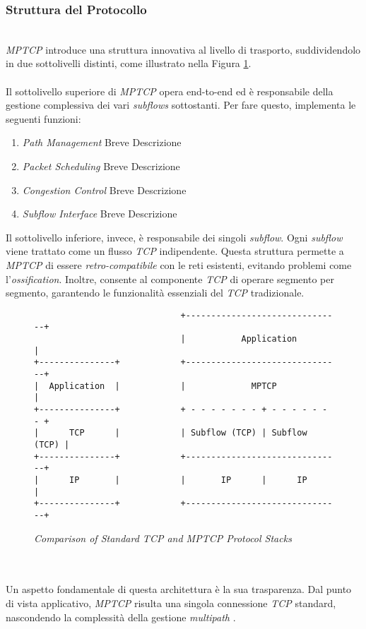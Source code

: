 \subsubsection{Struttura del Protocollo}
~\\
\indent \emph{MPTCP} introduce una struttura innovativa al livello di trasporto, suddividendolo in due sottolivelli distinti, come illustrato nella Figura \ref{comparison}.
\\\\
Il sottolivello superiore di \emph{MPTCP} opera end-to-end ed è responsabile della gestione complessiva dei vari \emph{subflows} sottostanti. Per fare questo, implementa le seguenti funzioni:
\begin{enumerate}[label=\roman*]
    \item \emph{Path Management} Breve Descrizione 
    \item \emph{Packet Scheduling} Breve Descrizione 
    \item \emph{Congestion Control} Breve Descrizione 
    \item \emph{Subflow Interface} Breve Descrizione 
\end{enumerate}
\noindent Il sottolivello inferiore, invece, è responsabile dei singoli \emph{subflow}. Ogni \emph{subflow} viene trattato come un flusso \emph{TCP} indipendente. Questa struttura permette a \emph{MPTCP} di essere \emph{retro-compatibile} con le reti esistenti, evitando problemi come l'\emph{ossification}. Inoltre, consente al componente \emph{TCP} di operare segmento per segmento, garantendo le funzionalità essenziali del \emph{TCP} tradizionale.
\begin{figure}[!h]
  \centering
    \begin{BVerbatim}
                             +-------------------------------+
                             |           Application         |
+---------------+            +-------------------------------+
|  Application  |            |             MPTCP             |
+---------------+            + - - - - - - - + - - - - - - - +
|      TCP      |            | Subflow (TCP) | Subflow (TCP) |
+---------------+            +-------------------------------+
|      IP       |            |       IP      |      IP       |
+---------------+            +-------------------------------+
               \end{BVerbatim}
    \caption{\emph{Comparison of Standard TCP and MPTCP Protocol Stacks}}
    \label{comparison}
    \end{figure}
\\\\
\noindent Un aspetto fondamentale di questa architettura è la sua trasparenza. Dal punto di vista applicativo, \emph{MPTCP} risulta una singola connessione \emph{TCP} standard, nascondendo la complessità della gestione \emph{multipath} \cite{site:mptcp-design}.
